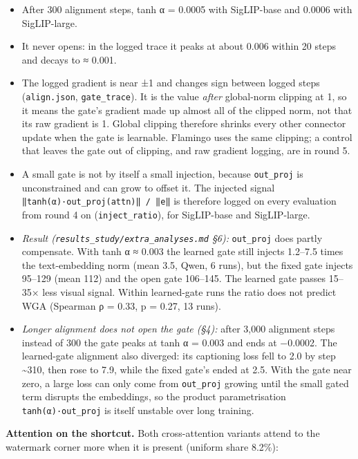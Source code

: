 \begin{itemize}
\item
  After 300 alignment steps, \textbar tanh α\textbar{} = 0.0005 with SigLIP-base and 0.0006 with SigLIP-large.
\item
  It never opens: in the logged trace it peaks at about 0.006 within 20 steps and decays to ≈ 0.001.
\item
  The logged gradient is near ±1 and changes sign between logged steps (\texttt{align.json}, \texttt{gate\_trace}). It is the
  value \emph{after} global-norm clipping at 1, so it means the gate's gradient made up almost all of the clipped
  norm, not that its raw gradient is 1. Global clipping therefore shrinks every other connector update when the
  gate is learnable. Flamingo uses the same clipping; a control that leaves the gate out of clipping, and raw
  gradient logging, are in round 5.
\item
  A small gate is not by itself a small injection, because \texttt{out\_proj} is unconstrained and can grow to
  offset it. The injected signal \texttt{‖tanh(α)·out\_proj(attn)‖\ /\ ‖e‖} is therefore logged on every evaluation
  from round 4 on (\texttt{inject\_ratio}), for SigLIP-base and SigLIP-large.
\item
  \emph{Result (\texttt{results\_study/extra\_analyses.md} §6):} \texttt{out\_proj} does partly compensate. With tanh α ≈ 0.003 the
  learned gate still injects 1.2--7.5 times the text-embedding norm (mean 3.5, Qwen, 6 runs), but the fixed
  gate injects 95--129 (mean 112) and the open gate 106--145. The learned gate passes 15--35× less visual
  signal. Within learned-gate runs the ratio does not predict WGA (Spearman ρ = 0.33, p = 0.27, 13 runs).
\item
  \emph{Longer alignment does not open the gate (§4):} after 3,000 alignment steps instead of 300 the gate peaks at
  \textbar tanh α\textbar{} = 0.003 and ends at −0.0002. The learned-gate alignment also diverged: its captioning loss fell to
  2.0 by step \textasciitilde310, then rose to 7.9, while the fixed gate's ended at 2.5. With the gate near zero, a large loss can only come
  from \texttt{out\_proj} growing until the small gated term disrupts the embeddings, so the product parametrisation
  \texttt{tanh(α)·out\_proj} is itself unstable over long training.
\end{itemize}

\textbf{Attention on the shortcut.} Both cross-attention variants attend to the watermark corner more when it is
present (uniform share 8.2\%):

